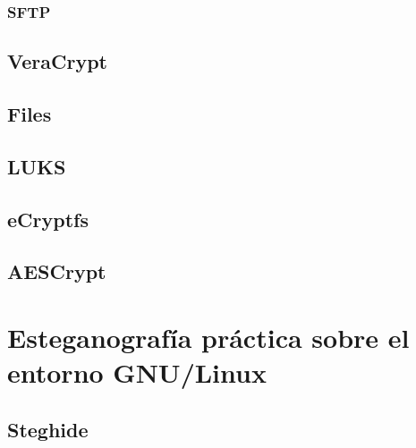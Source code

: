 \documentclass[a4paper, 11pt, titlepage]{article}
\begin{document}
    \subsubsection{SFTP}

    \subsection{VeraCrypt}
    \subsection{Files}
    \subsection{LUKS}
    \subsection{eCryptfs}
    \subsection{AESCrypt}

\section{Esteganografía práctica sobre el entorno GNU/Linux}

    \subsection{Steghide}

\end{document}
